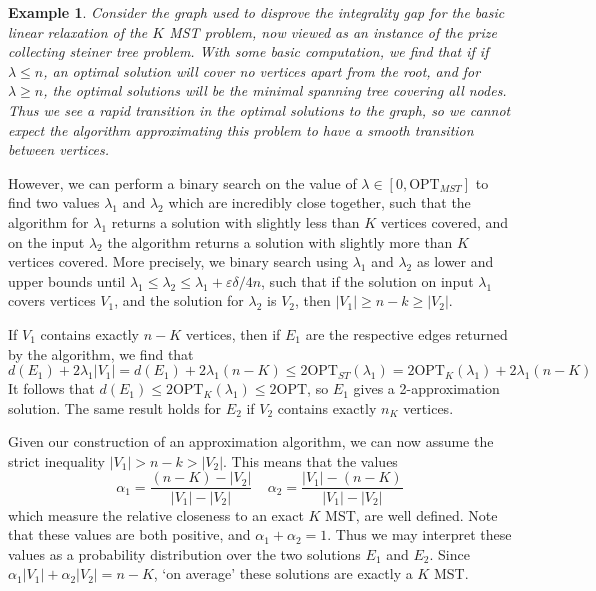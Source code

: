 \documentclass{article}
\theoremstyle{plain}
\newtheorem*{example}{Example}
\begin{document}
\begin{example}
    Consider the graph used to disprove the integrality gap for the basic linear relaxation of the $K$ MST problem, now viewed as an instance of the prize collecting steiner tree problem. With some basic computation, we find that if if $\lambda \leq n$, an optimal solution will cover no vertices apart from the root, and for $\lambda \geq n$, the optimal solutions will be the minimal spanning tree covering all nodes. Thus we see a rapid transition in the optimal solutions to the graph, so we cannot expect the algorithm approximating this problem to have a smooth transition between vertices.
\end{example}

However, we can perform a binary search on the value of $\lambda \in [0,\text{OPT}_{MST}]$ to find two values $\lambda_1$ and $\lambda_2$ which are incredibly close together, such that the algorithm for $\lambda_1$ returns a solution with slightly less than $K$ vertices covered, and on the input $\lambda_2$ the algorithm returns a solution with slightly more than $K$ vertices covered. More precisely, we binary search using $\lambda_1$ and $\lambda_2$ as lower and upper bounds until $\lambda_1 \leq \lambda_2 \leq \lambda_1 + \varepsilon \delta / 4n$, such that if the solution on input $\lambda_1$ covers vertices $V_1$, and the solution for $\lambda_2$ is $V_2$, then $|V_1| \geq n - k \geq |V_2|$.

If $V_1$ contains exactly $n-K$ vertices, then if $E_1$ are the respective edges returned by the algorithm, we find that
%
\[ d(E_1) + 2 \lambda_1 |V_1| = d(E_1) + 2 \lambda_1(n-K) \leq 2\text{OPT}_{ST}(\lambda_1) = 2\text{OPT}_K(\lambda_1) + 2\lambda_1(n-K) \]
%
It follows that $d(E_1) \leq 2 \text{OPT}_K(\lambda_1) \leq 2 \text{OPT}$, so $E_1$ gives a 2-approximation solution. The same result holds for $E_2$ if $V_2$ contains exactly $n_K$ vertices.

Given our construction of an approximation algorithm, we can now assume the strict inequality $|V_1| > n - k > |V_2|$. This means that the values
%
\[ \alpha_1 = \frac{(n-K) - |V_2|}{|V_1| - |V_2|}\ \ \ \ \ \alpha_2 = \frac{|V_1| - (n-K)}{|V_1| - |V_2|} \]
%
which measure the relative closeness to an exact $K$ MST, are well defined. Note that these values are both positive, and $\alpha_1 + \alpha_2 = 1$. Thus we may interpret these values as a probability distribution over the two solutions $E_1$ and $E_2$. Since $\alpha_1 |V_1| + \alpha_2 |V_2| = n-K$, `on average' these solutions are exactly a $K$ MST.
\end{document}
